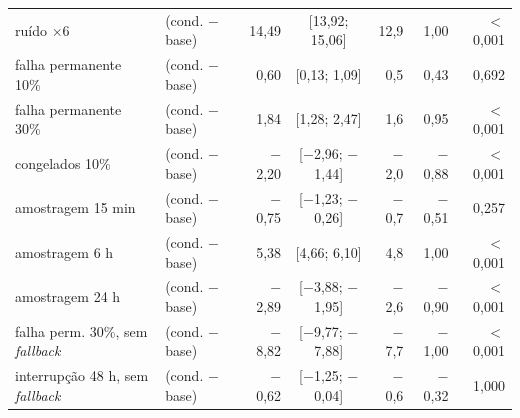 \begin{tabular}{@{}llrcrrr@{}}
ruído $\times$6 & \polD{} (cond. $-$ base) & 14,49 & [13,92; 15,06] & 12,9 & 1,00 & $<$0,001 \\
falha permanente 10\% & \polD{} (cond. $-$ base) & 0,60 & [0,13; 1,09] & 0,5 & 0,43 & 0,692 \\
falha permanente 30\% & \polD{} (cond. $-$ base) & 1,84 & [1,28; 2,47] & 1,6 & 0,95 & $<$0,001 \\
congelados 10\% & \polD{} (cond. $-$ base) & $-$2,20 & [$-$2,96; $-$1,44] & $-$2,0 & $-$0,88 & $<$0,001 \\
amostragem 15 min & \polD{} (cond. $-$ base) & $-$0,75 & [$-$1,23; $-$0,26] & $-$0,7 & $-$0,51 & 0,257 \\
amostragem 6 h & \polD{} (cond. $-$ base) & 5,38 & [4,66; 6,10] & 4,8 & 1,00 & $<$0,001 \\
amostragem 24 h & \polD{} (cond. $-$ base) & $-$2,89 & [$-$3,88; $-$1,95] & $-$2,6 & $-$0,90 & $<$0,001 \\
falha perm. 30\%, sem \emph{fallback} & \polD{} (cond. $-$ base) & $-$8,82 & [$-$9,77; $-$7,88] & $-$7,7 & $-$1,00 & $<$0,001 \\
interrupção 48 h, sem \emph{fallback} & \polD{} (cond. $-$ base) & $-$0,62 & [$-$1,25; $-$0,04] & $-$0,6 & $-$0,32 & 1,000 \\
\bottomrule
\end{tabular}
